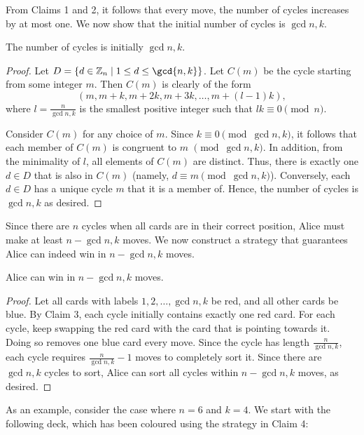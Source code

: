 From Claims 1 and 2, it follows that every move, the number of cycles increases by at most one. We now show that the initial number of cycles is $\gcd{n, k}$.

\begin{claim}{3}
    The number of cycles is initially $\gcd{n, k}$.
\end{claim}
\begin{proof}
    Let $D = \bc{d \in \ZZ_n \mid 1 \leq d \leq \gcd{n, k}}$. Let $C(m)$ be the cycle starting from some integer $m$. Then $C(m)$ is clearly of the form \[(m, m+k, m+2k, m+3k, \ldots, m+(l-1)k),\] where $l = \frac{n}{\gcd{n, k}}$ is the smallest positive integer such that $lk \equiv 0 \pmod{n}$.

    Consider $C(m)$ for any choice of $m$. Since $k \equiv 0 \pmod{\gcd{n, k}}$, it follows that each member of $C(m)$ is congruent to $m$ $\pmod{\gcd{n, k}}$. In addition, from the minimality of $l$, all elements of $C(m)$ are distinct. Thus, there is exactly one $d \in D$ that is also in $C(m)$ (namely, $d \equiv m \pmod{\gcd{n, k}}$). Conversely, each $d \in D$ has a unique cycle $m$ that it is a member of. Hence, the number of cycles is $\gcd{n, k}$ as desired.
\end{proof}

Since there are $n$ cycles when all cards are in their correct position, Alice must make at least $n - \gcd{n, k}$ moves. We now construct a strategy that guarantees Alice can indeed win in $n -\gcd{n, k}$ moves.

\begin{claim}{4}
    Alice can win in $n - \gcd{n, k}$ moves.
\end{claim}
\begin{proof}
    Let all cards with labels $1, 2, \ldots, \gcd{n, k}$ be red, and all other cards be blue. By Claim 3, each cycle initially contains exactly one red card. For each cycle, keep swapping the red card with the card that is pointing towards it. Doing so removes one blue card every move. Since the cycle has length $\frac{n}{\gcd{n, k}}$, each cycle requires $\frac{n}{\gcd{n, k}} - 1$ moves to completely sort it. Since there are $\gcd{n, k}$ cycles to sort, Alice can sort all cycles within $n - \gcd{n, k}$ moves, as desired.
\end{proof}

As an example, consider the case where $n = 6$ and $k = 4$. We start with the following deck, which has been coloured using the strategy in Claim 4:

